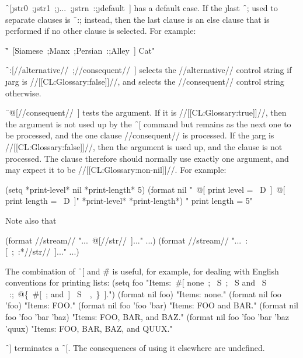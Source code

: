 \f{~[\j{str0}~;\j{str1}~;\j{...}~;\j{strn}~:;\j{default}~]} has a default case. If the \j{last} \f{~;} used to separate clauses is \f{~:;} instead, then the last clause is an else clause that is performed if no other clause is selected. For example:

\f{"~[Siamese~;Manx~;Persian~:;Alley~] Cat"}

\f{~:[//alternative//~;//consequent//~]}  selects the //alternative// control string if \j{arg} is //[[CL:Glossary:false]]//, and selects the //consequent// control string otherwise.
                                                             

\f{~@[//consequent//~]}  tests the argument.  If it is //[[CL:Glossary:true]]//,            then the argument is not used up by the \f{~[} command but remains as the next one to be processed, and the one clause //consequent// is processed. If the \j{arg} is //[[CL:Glossary:false]]//, then the argument is used up, and the clause is not processed. The clause therefore should normally use exactly one argument, and may expect it to be //[[CL:Glossary:non-nil]]//. For example:

\code
 (setq *print-level* nil *print-length* 5)
 (format nil
        "~@[ print level = ~D~]~@[ print length = ~D~]"
        *print-level* *print-length*) \EV  " print length = 5" \endcode

Note also that

\code
 (format //stream// "...~@[//str//~]..." ...) \EQ (format //stream// "...~:[~;~:*//str//~]..." ...) \endcode

The combination of \f{~[} and \f{\#} is useful, for example, for dealing with English conventions for printing lists:
                          \code
 (setq foo "Items:~#[ none~; ~S~; ~S and ~S~
           ~:;~@\{~#[~; and~] ~S~\hat\ ,~\}~].")
 (format nil foo) \EV  "Items: none."
 (format nil foo 'foo) \EV  "Items: FOO."
 (format nil foo 'foo 'bar) \EV  "Items: FOO and BAR."
 (format nil foo 'foo 'bar 'baz) \EV  "Items: FOO, BAR, and BAZ."
 (format nil foo 'foo 'bar 'baz 'quux) \EV  "Items: FOO, BAR, BAZ, and QUUX." \endcode

\endsubsubsection%

 

\f{~]} terminates a \f{~[}. The consequences of using it elsewhere are undefined.

